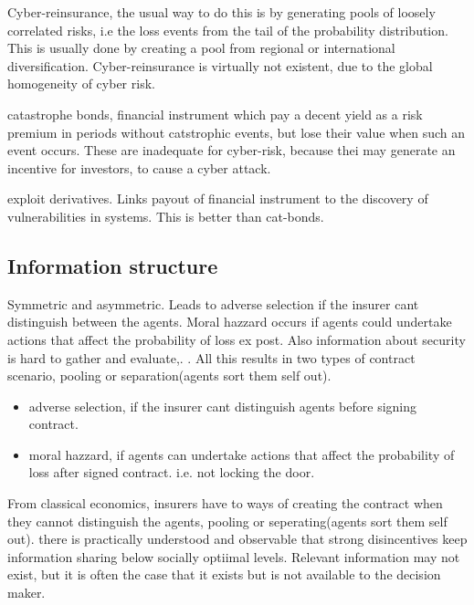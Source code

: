 Cyber-reinsurance, the usual way to do this is by generating pools of loosely correlated risks, i.e the loss events from the tail of the probability distribution. This is usually done by creating a pool from regional or international diversification. Cyber-reinsurance is virtually not existent, due to the global homogeneity of cyber risk. 

catastrophe bonds, financial instrument which pay a decent yield as a risk premium in periods without 
catstrophic events, but lose their value when such an event occurs. 
These are inadequate for cyber-risk, because thei may generate an incentive for investors, 
to cause a cyber attack.

exploit derivatives. Links payout of financial instrument to the discovery of vulnerabilities in systems. This is better than cat-bonds. 
\subsection{Information structure}
Symmetric and asymmetric. Leads to adverse selection if the insurer cant distinguish
 between the agents. Moral hazzard occurs if agents could undertake actions that affect
  the probability of loss ex post. Also information about security is hard to gather and
   evaluate,. . All this results in two types of contract scenario, pooling or
    separation(agents sort them self out).
    \begin{itemize}
    \item adverse selection, if the insurer cant distinguish agents before signing contract.
    \item moral hazzard, if agents can undertake actions that affect the probability of loss after signed contract. i.e. not locking the door.
    \end{itemize}
    From classical economics, insurers have to ways of creating the contract when they cannot distinguish the agents, pooling or seperating(agents sort them self out).
    there is practically understood and observable that strong disincentives keep information sharing below socially optiimal levels. Relevant information may not exist, 
    but it is often the case that it exists but is not available to the decision maker.
